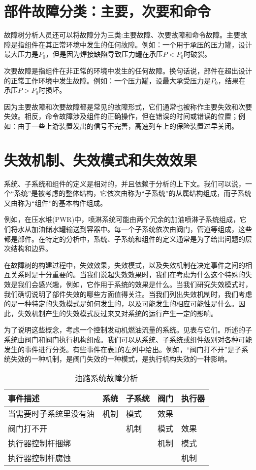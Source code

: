 \documentclass[cn,11pt,chinese]{elegantbook}
\begin{document}
\section{部件故障分类：主要，次要和命令}

故障树分析人员还可以将故障分为三类:主要故障、次要故障和命令故障。主要故障是指组件在其正常环境中发生的任何故障。例如：一个用于承压的压力罐，设计最大压力是$P_0$，但是因为焊接缺陷导致压力罐在承压$P<P_0$时破裂。

次要故障是指组件在非正常的环境中发生的任何故障。换句话说，部件在超出设计的正常工作环境中发生故障。例如：一个压力罐，设最大承受压力是$P_0$，结果在承压$P>P_0$时损坏。

因为主要故障和次要故障都是常见的故障形式，它们通常也被称作主要失效和次要失效。相反，命令故障涉及组件的正确操作，但在错误的时间或错误的位置；例如：由于一些上游装置发出的信号不完善，高速列车上的保险装置过早关闭。

\section{失效机制、失效模式和失效效果}

系统、子系统和组件的定义是相对的，并且依赖于分析的上下文。我们可以说，一个“系统”是被考虑的整体结构，它依次由称为“子系统”的从属结构组成，而子系统又由称为“组件”的基本构件组成。

例如，在压水堆(PWR)中，喷淋系统可能由两个冗余的加油喷淋子系统组成，它们将水从加油储水罐输送到容器中。每一个子系统依次由阀门，管道等组成，这些都是部件。在特定的分析中，系统、子系统和组件的定义通常是为了给出问题的层次结构和边界。

在故障树的构建过程中，失效效果，失效模式，以及失效机制在决定事件之间的相互关系时是十分重要的。当我们说起失效效果时，我们在考虑为什么这个特殊的失效是我们会感兴趣，例如，它作用于系统的效果是什么。当我们研究失效模式时，我们确切说明了部件失效的哪些方面值得关注。当我们列出失效机制时，我们考虑的是一种特定的失效模式是如何发生的，以及可能发生的相应可能性是什么。因此，失效机制产生的失效模式反过来又对系统的运行产生一定的影响。

为了说明这些概念，考虑一个控制发动机燃油流量的系统。见表与它们。所述的子系统由阀门和阀门执行机构组成。我们可以从系统、子系统或组件级别对各种可能发生的事件进行分类。有些事件在表\ref{tab:tab5_1}的左列中给出。例如，“阀门打不开”是子系统失效的一种机制，是阀门失效的一种模式，是执行机构失效的一种影响。

\begin{table}[htpb]
	\centering
	\caption{油路系统故障分析}
	\label{tab:tab5_1}
	\begin{tabular}{@{}lllll@{}}
		\toprule
		事件描述        & 系统 & 子系统 & 阀门 & 执行器 \\ \midrule
		当需要时子系统里没有油 & 机制 & 模式  & 效果 &     \\
		阀门打不开       &    & 机制  & 模式 & 效果  \\
		执行器控制杆捆绑    &    &     & 机制 & 模式  \\
		执行器控制杆腐蚀    &    &     &    & 机制  \\ \bottomrule
	\end{tabular}
\end{table}
\end{document}
